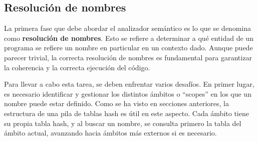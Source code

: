 \subsection{Resolución de nombres}
La primera fase que debe abordar el analizador semántico es lo que se denomina como \textbf{resolución de nombres}. Esto se refiere a determinar a qué entidad de un programa se refiere un nombre en particular en un contexto dado. Aunque puede parecer trivial, la correcta resolución de nombres es fundamental para garantizar la coherencia y la correcta ejecución del código. 

\vspace{0.5cm}

Para llevar a cabo esta tarea, se deben enfrentar varios desafíos. En primer lugar, es necesario identificar y gestionar los distintos ámbitos o ``scopes'' en los que un nombre puede estar definido. Como se ha visto en secciones anteriores, la estructura de una pila de tablas hash es útil en este aspecto. Cada ámbito tiene su propia tabla hash, y al buscar un nombre, se consulta primero la tabla del ámbito actual, avanzando hacia ámbitos más externos si es necesario.

